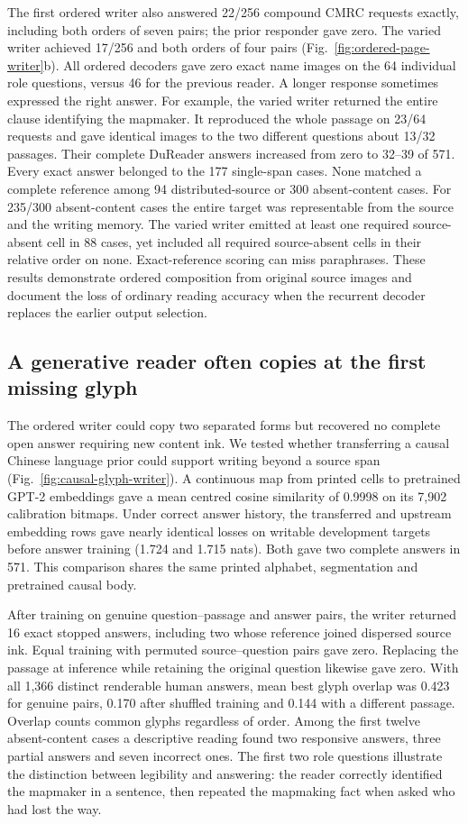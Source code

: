 \documentclass[12pt,a4paper]{article}
\providecommand{\DIFadd}[1]{{\protect\color{blue} \sf #1}} %
\begin{document}
\DIFadd{The first ordered writer also answered 22/256 compound CMRC requests exactly, including both orders of seven pairs; the prior responder gave zero. The varied writer achieved 17/256 and both orders of four pairs (Fig.~\ref{fig:ordered-page-writer}b). All ordered decoders gave zero exact name images on the 64 individual role questions, versus 46 for the previous reader. A longer response sometimes expressed the right answer. For example, the varied writer returned the entire clause identifying the mapmaker. It reproduced the whole passage on 23/64 requests and gave identical images to the two different questions about 13/32 passages. Their complete DuReader answers increased from zero to 32--39 of 571. Every exact answer belonged to the 177 single-span cases. None matched a complete reference among 94 distributed-source or 300 absent-content cases. For 235/300 absent-content cases the entire target was representable from the source and the writing memory. The varied writer emitted at least one required source-absent cell in 88 cases, yet included all required source-absent cells in their relative order on none. Exact-reference scoring can miss paraphrases. These results demonstrate ordered composition from original source images and document the loss of ordinary reading accuracy when the recurrent decoder replaces the earlier output selection.
}

\subsection*{\DIFadd{A generative reader often copies at the first missing glyph}}
\DIFadd{The ordered writer could copy two separated forms but recovered no complete open answer requiring new content ink. We tested whether transferring a causal Chinese language prior could support writing beyond a source span (Fig.~\ref{fig:causal-glyph-writer}). A continuous map from printed cells to pretrained GPT-2 embeddings gave a mean centred cosine similarity of 0.9998 on its 7,902 calibration bitmaps. Under correct answer history, the transferred and upstream embedding rows gave nearly identical losses on writable development targets before answer training (1.724 and 1.715 nats). Both gave two complete answers in 571. This comparison shares the same printed alphabet, segmentation and pretrained causal body.
}

\DIFadd{After training on genuine question--passage and answer pairs, the writer returned 16 exact stopped answers, including two whose reference joined dispersed source ink. Equal training with permuted source--question pairs gave zero. Replacing the passage at inference while retaining the original question likewise gave zero. With all 1,366 distinct renderable human answers, mean best glyph overlap was 0.423 for genuine pairs, 0.170 after shuffled training and 0.144 with a different passage. Overlap counts common glyphs regardless of order. Among the first twelve absent-content cases a descriptive reading found two responsive answers, three partial answers and seven incorrect ones. The first two role questions illustrate the distinction between legibility and answering: the reader correctly identified the mapmaker in a sentence, then repeated the mapmaking fact when asked who had lost the way.
}
\end{document}

